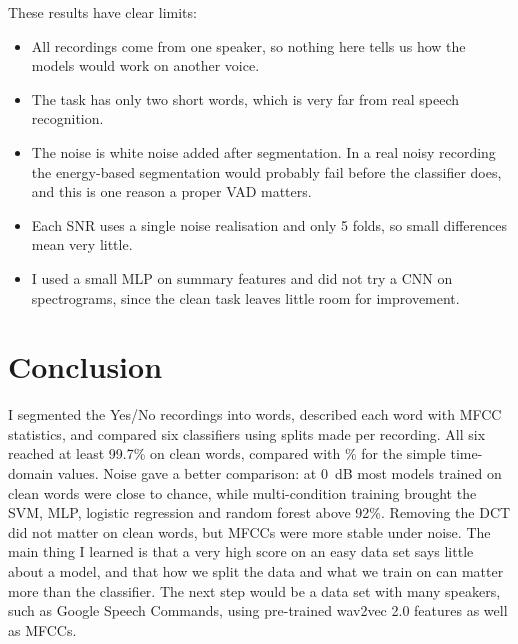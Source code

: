\documentclass[11pt,a4paper]{article}
\begin{document}
These results have clear limits:
\begin{itemize}[nosep,leftmargin=*]
\item All recordings come from one speaker, so nothing here tells us how the models would work on another voice.
\item The task has only two short words, which is very far from real speech recognition.
\item The noise is white noise added after segmentation. In a real noisy recording the energy-based segmentation would probably fail before the classifier does, and this is one reason a proper VAD matters.
\item Each SNR uses a single noise realisation and only 5 folds, so small differences mean very little.
\item I used a small MLP on summary features and did not try a CNN on spectrograms, since the clean task leaves little room for improvement.
\end{itemize}

\section{Conclusion}
I segmented the Yes/No recordings into words, described each word with MFCC statistics, and compared six classifiers using splits made per recording. All six reached at least 99.7\% on clean words, compared with \TimeBase\% for the simple time-domain values. Noise gave a better comparison: at 0~dB most models trained on clean words were close to chance, while multi-condition training brought the SVM, MLP, logistic regression and random forest above 92\%. Removing the DCT did not matter on clean words, but MFCCs were more stable under noise. The main thing I learned is that a very high score on an easy data set says little about a model, and that how we split the data and what we train on can matter more than the classifier. The next step would be a data set with many speakers, such as Google Speech Commands, using pre-trained wav2vec 2.0 features as well as MFCCs.
\end{document}
